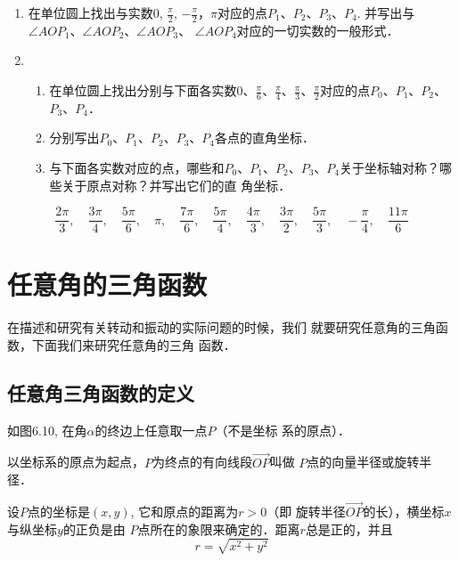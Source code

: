 \begin{ex}
\begin{enumerate}
   \item 在单位圆上找出与实数0, $\frac{\pi}{2}$, $-\frac{\pi}{2}$，$\pi$对应的点$P_1$、$P_2$、$P_3$、$P_4$. 并写出与$\angle AOP_1$、$\angle AOP_2$、$\angle AOP_3$、
$\angle AOP_4$对应的一切实数的一般形式．


\item \begin{enumerate}
\item 在单位圆上找出分别与下面各实数0、$\frac{\pi}{6}$、$\frac{\pi}{4}$、$\frac{\pi}{3}$、$\frac{\pi}{2}$对应的点$P_0$、$P_1$、$P_2$、$P_3$、$P_4$．
\item 分别写出$P_0$、$P_1$、$P_2$、$P_3$、$P_4$各点的直角坐标．
\item 与下面各实数对应的点，哪些和$P_0$、$P_1$、$P_2$、$P_3$、$P_4$关于坐标轴对称？哪些关于原点对称？并写出它们的直
角坐标．
\end{enumerate} 
\end{enumerate}
\[\frac{2\pi}{3},\quad \frac{3\pi}{4},\quad \frac{5\pi}{6},\quad \pi,\quad \frac{7\pi}{6},\quad \frac{5\pi}{4},\quad \frac{4\pi}{3},\quad \frac{3\pi}{2},\quad \frac{5\pi}{3},\quad -\frac{\pi}{4},\quad \frac{11\pi}{6}\]
\end{ex}

\section{任意角的三角函数}
在描述和研究有关转动和振动的实际问题的时候，我们
就要研究任意角的三角函数，下面我们来研究任意角的三角
函数．

\subsection{任意角三角函数的定义}
如图6.10, 在角$\alpha$的终边上任意取一点$P$（不是坐标
系的原点）．

以坐标系的原点为起点，$P$为终点的有向线段$\Vec{OP}$叫做
$P$点的向量半径或旋转半径．

设$P$点的坐标是$(x,y)$, 它和原点的距离为$r>0$（即
旋转半径$\Vec{OP}$的长），横坐标$x$与纵坐标$y$的正负是由
$P$点所在的象限来确定的．距离$r$总是正的，并且
\[r=\sqrt{x^2+y^2}\]

\begin{figure}[htp]
    \centering
{}
    \caption{}
\end{figure}

